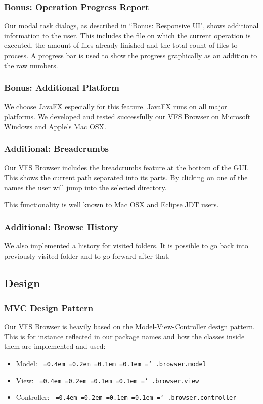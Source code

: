 \documentclass[a4paper,12pt]{article}
\newcommand*\justify{%
  \fontdimen2\font=0.4em%
  \fontdimen3\font=0.2em%
  \fontdimen4\font=0.1em%
  \fontdimen7\font=0.1em%
  \hyphenchar\font=`\-%
}
\newcommand{\mono}[1]{\texttt{\justify #1}}
\begin{document}
\subsubsection{Bonus: Operation Progress Report}
Our modal task dialogs, as described in ``Bonus: Responsive UI", shows additional information to the user. This includes the file on which the current operation is executed, the amount of files already finished and the total count of files to process. A progress bar is used to show the progress graphically as an addition to the raw numbers.

\subsubsection{Bonus: Additional Platform}
We choose JavaFX especially for this feature. JavaFX runs on all major platforms. We developed and tested successfully our VFS Browser on Microsoft Windows and Apple's Mac OSX.

\subsubsection{Additional: Breadcrumbs}
Our VFS Browser includes the breadcrumbs feature at the bottom of the GUI. This shows the current path separated into its parts. By clicking on one of the names the user will jump into the selected directory.

This functionality is well known to Mac OSX and Eclipse JDT users.

\subsubsection{Additional: Browse History}
We also implemented a history for visited folders. It is possible to go back into previously visited folder and to go forward after that.

\subsection{Design}

\subsubsection{MVC Design Pattern}
Our VFS Browser is heavily based on the Model-View-Controller design pattern. This is for instance reflected in our package names and how the classes inside them are implemented and used:
\begin{itemize}
    \item Model: \mono{.browser.model}
    \item View: \mono{.browser.view}
    \item Controller: \mono{.browser.controller}
\end{itemize}
\end{document}

